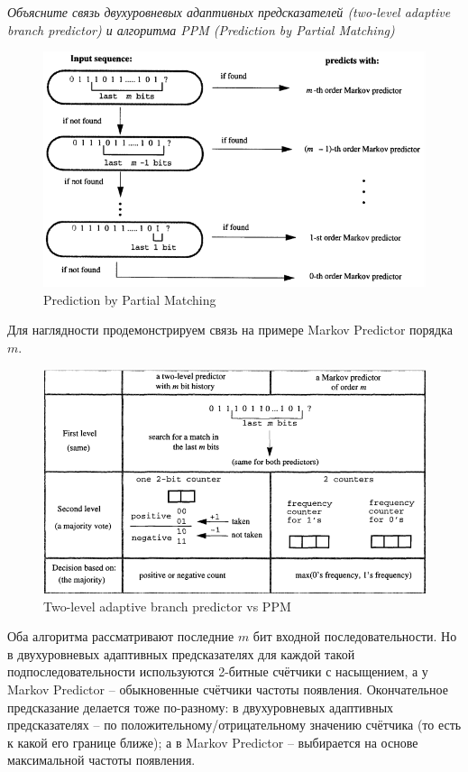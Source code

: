 	\textit{Объясните связь двухуровневых адаптивных предсказателей (two-level adaptive branch predictor) и алгоритма PPM (Prediction by Partial Matching)}
	
	\begin{figure}[h!]
		\centering
		\includegraphics[width=\linewidth]{pictures/PPM.png}
		\caption{Prediction by Partial Matching}
	\end{figure}

	Для наглядности продемонстрируем связь на примере Markov Predictor порядка $m$.

	\begin{figure}[h!]
		\centering
		\includegraphics[width=\linewidth]{pictures/two-level-vs-ppm.png}
		\caption{Two-level adaptive branch predictor vs PPM}
	\end{figure}
	
	Оба алгоритма рассматривают последние $m$ бит входной последовательности. Но в двухуровневых адаптивных предсказателях для каждой такой подпоследовательности используются 2-битные счётчики с насыщением, а у Markov Predictor -- обыкновенные счётчики частоты появления. Окончательное предсказание делается тоже по-разному: в двухуровневых адаптивных предсказателях -- по положительному/отрицательному значению счётчика (то есть к какой его границе ближе); а в Markov Predictor -- выбирается на основе максимальной частоты появления.
	
